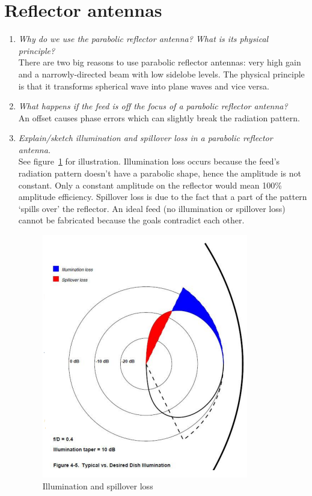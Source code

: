 \documentclass[11pt,a4paper]{article}
\begin{document}
\newpage\section{Reflector antennas}
\begin{enumerate}
    \item \emph{Why do we use the parabolic reflector antenna? What is its physical principle?}\\
    There are two big reasons to use parabolic reflector antennas: very high gain and a narrowly-directed beam with low sidelobe levels. The physical principle is that it transforms spherical wave into plane waves and vice versa.

    \item \emph{What happens if the feed is off the focus of a parabolic reflector antenna?}\\
    An offset causes phase errors which can slightly break the radiation pattern.
    
    \item \emph{Explain/sketch illumination and spillover loss in a parabolic reflector antenna.}\\
    See figure~\ref{fig:losses-in-reflector-antennas} for illustration. Illumination loss occurs because the feed's radiation pattern doesn't have a parabolic shape, hence the amplitude is not constant. Only a constant amplitude on the reflector would mean 100\% amplitude efficiency. Spillover loss is due to the fact that a part of the pattern `spills over' the reflector. An ideal feed (no illumination or spillover loss) cannot be fabricated because the goals contradict each other.
    \begin{figure}[!ht]
        \centering
        \includegraphics[width=.4\textwidth]{src/losses-in-reflector-antennas.png}
        \caption{\label{fig:losses-in-reflector-antennas}Illumination and spillover loss}
    \end{figure}
    

\end{enumerate}
\end{document}
